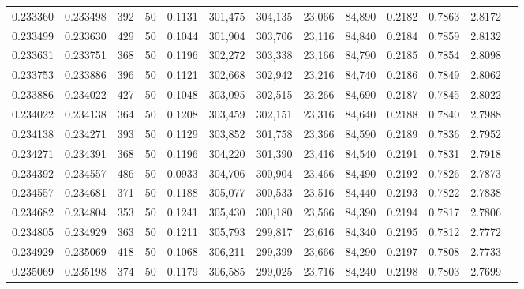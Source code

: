 \begin{tabular}{rrrrrrrrrrrrr}
0.233360 & 0.233498 &   392 &  50 &                                     0.1131 & 301,475 & 304,135 &  23,066 &  84,890 & 0.2182 & 0.7863 & 2.8172 \\
0.233499 & 0.233630 &   429 &  50 &                                     0.1044 & 301,904 & 303,706 &  23,116 &  84,840 & 0.2184 & 0.7859 & 2.8132 \\
0.233631 & 0.233751 &   368 &  50 &                                     0.1196 & 302,272 & 303,338 &  23,166 &  84,790 & 0.2185 & 0.7854 & 2.8098 \\
0.233753 & 0.233886 &   396 &  50 &                                     0.1121 & 302,668 & 302,942 &  23,216 &  84,740 & 0.2186 & 0.7849 & 2.8062 \\
0.233886 & 0.234022 &   427 &  50 &                                     0.1048 & 303,095 & 302,515 &  23,266 &  84,690 & 0.2187 & 0.7845 & 2.8022 \\
0.234022 & 0.234138 &   364 &  50 &                                     0.1208 & 303,459 & 302,151 &  23,316 &  84,640 & 0.2188 & 0.7840 & 2.7988 \\
0.234138 & 0.234271 &   393 &  50 &                                     0.1129 & 303,852 & 301,758 &  23,366 &  84,590 & 0.2189 & 0.7836 & 2.7952 \\
0.234271 & 0.234391 &   368 &  50 &                                     0.1196 & 304,220 & 301,390 &  23,416 &  84,540 & 0.2191 & 0.7831 & 2.7918 \\
0.234392 & 0.234557 &   486 &  50 &                                     0.0933 & 304,706 & 300,904 &  23,466 &  84,490 & 0.2192 & 0.7826 & 2.7873 \\
0.234557 & 0.234681 &   371 &  50 &                                     0.1188 & 305,077 & 300,533 &  23,516 &  84,440 & 0.2193 & 0.7822 & 2.7838 \\
0.234682 & 0.234804 &   353 &  50 &                                     0.1241 & 305,430 & 300,180 &  23,566 &  84,390 & 0.2194 & 0.7817 & 2.7806 \\
0.234805 & 0.234929 &   363 &  50 &                                     0.1211 & 305,793 & 299,817 &  23,616 &  84,340 & 0.2195 & 0.7812 & 2.7772 \\
0.234929 & 0.235069 &   418 &  50 &                                     0.1068 & 306,211 & 299,399 &  23,666 &  84,290 & 0.2197 & 0.7808 & 2.7733 \\
0.235069 & 0.235198 &   374 &  50 &                                     0.1179 & 306,585 & 299,025 &  23,716 &  84,240 & 0.2198 & 0.7803 & 2.7699 \\

\end{tabular}
